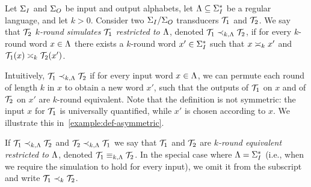 Let $\sI$ and $\sO$ be input and output alphabets, let $\fL\subseteq \sI^*$ be a regular language, and let $k>0$. Consider two $\sI/\sO$ transducers $\cT_1$ and $\cT_2$. We say that \emph{$\cT_2$ $k$-round simulates $\cT_1$ restricted to $\fL$}, denoted $\cT_1\prec_{k,\fL} \cT_2$, if for every $k$-round word $x\in \fL$ there exists a $k$-round word $x'\in \sI^*$ such that $x\req[k] x'$ and $\cT_1(x)\req[k] \cT_2(x')$. 

Intuitively, $\cT_1\prec_{k,\fL} \cT_2$ if for every input word $x\in \fL$, we can permute each round of length $k$ in $x$ to obtain a new word $x'$, such that the outputs of $\cT_1$ on $x$ and of $\cT_2$ on $x'$ are $k$-round equivalent.
Note that the definition is not symmetric: the input $x$ for $\cT_1$ is universally quantified, while $x'$ is chosen according to $x$. We illustrate this in~\cref{example:def-asymmetric}.

If $\cT_1\prec_{k,\fL} \cT_2$ and $\cT_2\prec_{k,\fL} \cT_1$ we say that $\cT_1$ and $\cT_2$ are \emph{$k$-round equivalent restricted to $\fL$}, denoted $\cT_1\equiv_{k,\fL} \cT_2$. 
In the special case where $\fL=\sI^*$ (i.e., when we require the simulation to hold for every input), we omit it from the subscript and write $\cT_1\prec_k \cT_2$.

